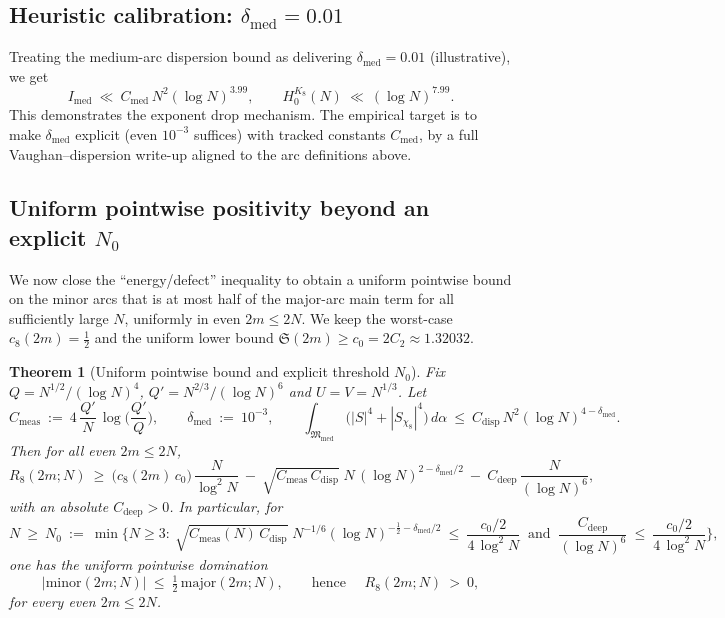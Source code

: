 \documentclass[11pt]{article}
\newtheorem{theorem}{Theorem}
\theoremstyle{definition}
\theoremstyle{remark}
\begin{document}
\subsection*{Heuristic calibration: $\delta_{\mathrm{med}}=0.01$}
Treating the medium-arc dispersion bound as delivering $\delta_{\mathrm{med}}=0.01$ (illustrative), we get
\[
I_{\mathrm{med}}\ \ll\ C_{\mathrm{med}}\,N^2(\log N)^{3.99},\qquad H_0^{K_8}(N)\ \ll\ (\log N)^{7.99}.
\]
This demonstrates the exponent drop mechanism. The empirical target is to make $\delta_{\mathrm{med}}$ explicit (even $10^{-3}$ suffices) with tracked constants $C_{\mathrm{med}}$, by a full Vaughan–dispersion write-up aligned to the arc definitions above.


\subsection*{Uniform pointwise positivity beyond an explicit $N_0$}
We now close the “energy/defect” inequality to obtain a uniform pointwise bound on the minor arcs that is at most half of the major-arc main term for all sufficiently large $N$, 
uniformly in even $2m\le 2N$. We keep the worst-case $c_8(2m)=\tfrac12$ and the uniform lower bound $\mathfrak S(2m)\ge c_0=2C_2\approx 1.32032$.

\begin{theorem}[Uniform pointwise bound and explicit threshold $N_0$]\label{thm:uniform-pointwise}
Fix $Q=N^{1/2}/(\log N)^4$, $Q'=N^{2/3}/(\log N)^6$ and $U=V=N^{1/3}$. Let
\[
 C_{\mathrm{meas}}\ :=\ 4\,\frac{Q'}{N}\,\log\!\Big(\frac{Q'}{Q}\Big),\qquad
 \delta_{\mathrm{med}}\ :=\ 10^{-3},\qquad 
 \int_{\mathfrak M_{\mathrm{med}}}\big(|S|^4+|S_{\chi_8}|^4\big)\,d\alpha\ \le\ C_{\mathrm{disp}}\,N^2(\log N)^{4-\delta_{\mathrm{med}}}.
\]
Then for all even $2m\le 2N$,
\[
 R_8(2m;N)\ \ge\ \big(c_8(2m)\,c_0\big)\,\frac{N}{\log^2N}\ -\ \sqrt{C_{\mathrm{meas}}\,C_{\mathrm{disp}}}\;N\,(\log N)^{2-\delta_{\mathrm{med}}/2}\ -\ C_{\mathrm{deep}}\,\frac{N}{(\log N)^6},
\]
with an absolute $C_{\mathrm{deep}}>0$. In particular, for
\[
 N\ \ge\ N_0\ :=\ \min\Big\{N\ge 3:\ \sqrt{C_{\mathrm{meas}}(N)\,C_{\mathrm{disp}}}\;N^{-1/6}(\log N)^{-\tfrac12-\delta_{\mathrm{med}}/2}\ \le\ \frac{c_0/2}{4\,\log^2 N}\ \text{ and }\ \frac{C_{\mathrm{deep}}}{(\log N)^6}\ \le\ \frac{c_0/2}{4\,\log^2 N}\Big\},
\]
one has the uniform pointwise domination
\[
 \big|\mathrm{minor}(2m;N)\big|\ \le\ \tfrac12\,\mathrm{major}(2m;N),\qquad \text{hence }\quad R_8(2m;N)\ >\ 0,
\]
for every even $2m\le 2N$.
\end{theorem}
\end{document}
